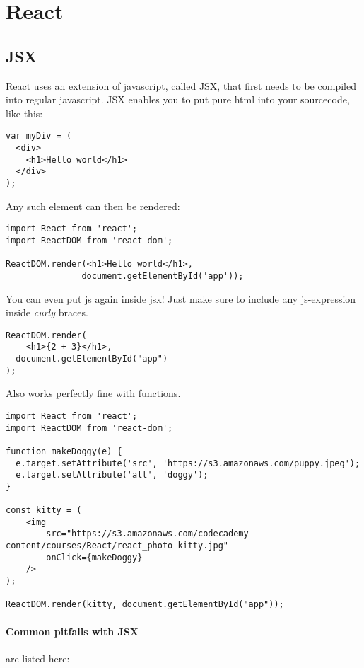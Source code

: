 
\section{React}

\subsection{JSX}

React uses an extension of javascript, called JSX, that first needs to be compiled into regular javascript. JSX enables you to put pure html into your sourcecode, like this: 

\begin{lstlisting}
var myDiv = (
  <div>
    <h1>Hello world</h1>
  </div>
);
\end{lstlisting}

Any such element can then be rendered:
\begin{lstlisting}
import React from 'react';
import ReactDOM from 'react-dom';

ReactDOM.render(<h1>Hello world</h1>, 
               document.getElementById('app'));
\end{lstlisting}

You can even put js again inside jsx! Just make sure to include any js-expression inside \emph{curly} braces. 
\begin{lstlisting}
ReactDOM.render(
	<h1>{2 + 3}</h1>,
  document.getElementById("app")
);
\end{lstlisting}

Also works perfectly fine with functions.
\begin{lstlisting}
import React from 'react';
import ReactDOM from 'react-dom';

function makeDoggy(e) {
  e.target.setAttribute('src', 'https://s3.amazonaws.com/puppy.jpeg');
  e.target.setAttribute('alt', 'doggy');
}

const kitty = (
	<img 
		src="https://s3.amazonaws.com/codecademy-content/courses/React/react_photo-kitty.jpg" 
        onClick={makeDoggy}
    />
);

ReactDOM.render(kitty, document.getElementById("app"));
\end{lstlisting}

\paragraph{Common pitfalls with JSX} are listed here: 


